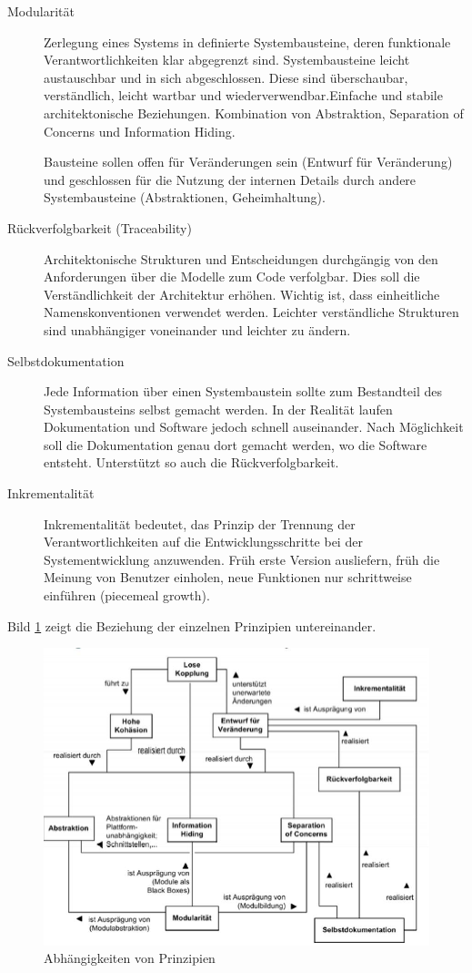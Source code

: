 \begin{description}
	\item[Modularität] Zerlegung eines Systems in definierte Systembausteine, deren funktionale Verantwortlichkeiten klar abgegrenzt sind. Systembausteine leicht austauschbar und in sich abgeschlossen. Diese sind überschaubar, verständlich, leicht wartbar und wiederverwendbar.Einfache und stabile architektonische Beziehungen. Kombination von Abstraktion, Separation of Concerns und Information Hiding.
	
	Bausteine sollen offen für Veränderungen sein (Entwurf für Veränderung) und geschlossen für die Nutzung der internen Details durch andere Systembausteine (Abstraktionen, Geheimhaltung).
	
	\item[Rückverfolgbarkeit (Traceability)] Architektonische Strukturen und Entscheidungen durchgängig von den Anforderungen über die Modelle zum Code verfolgbar. Dies soll die Verständlichkeit der Architektur erhöhen. Wichtig ist, dass einheitliche Namenskonventionen verwendet werden. Leichter verständliche Strukturen sind unabhängiger voneinander und leichter zu ändern.
	
	\item[Selbstdokumentation] Jede Information über einen Systembaustein sollte zum Bestandteil des Systembausteins selbst gemacht werden. In der Realität laufen Dokumentation und Software jedoch schnell auseinander. Nach Möglichkeit soll die Dokumentation genau dort gemacht werden, wo die Software entsteht. Unterstützt so auch die Rückverfolgbarkeit.
	
	\item[Inkrementalität] Inkrementalität bedeutet, das Prinzip der Trennung der Verantwortlichkeiten auf die Entwicklungsschritte bei der Systementwicklung anzuwenden. Früh erste Version ausliefern, früh die Meinung von Benutzer einholen, neue Funktionen nur schrittweise einführen (piecemeal growth).
	
\end{description}

\newpage

Bild \ref{fig:abhangigkeiten-prinzipien} zeigt die Beziehung der einzelnen Prinzipien untereinander.

\begin{figure}[h!]
	\centering
	\includegraphics[width=0.6\linewidth]{fig/abhaengigkeiten-prinzipien}
	\caption{Abhängigkeiten von Prinzipien}
	\label{fig:abhangigkeiten-prinzipien}
\end{figure}

